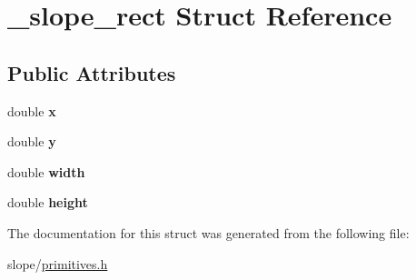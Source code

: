 \hypertarget{struct__slope__rect}{\section{\+\_\+slope\+\_\+rect Struct Reference}
\label{struct__slope__rect}
}
\subsection*{Public Attributes}
\begin{DoxyCompactItemize}
\item 
\hypertarget{struct__slope__rect_a50861a894de903db2ee81e7d47d35e47}{double {\bfseries x}}\label{struct__slope__rect_a50861a894de903db2ee81e7d47d35e47}

\item 
\hypertarget{struct__slope__rect_a6973dc88937c8034771edfc69288feb0}{double {\bfseries y}}\label{struct__slope__rect_a6973dc88937c8034771edfc69288feb0}

\item 
\hypertarget{struct__slope__rect_a09583ea10ed82dd3fe64da7e7a6bfb24}{double {\bfseries width}}\label{struct__slope__rect_a09583ea10ed82dd3fe64da7e7a6bfb24}

\item 
\hypertarget{struct__slope__rect_aee8ea863cafdbee525219b26bd400177}{double {\bfseries height}}\label{struct__slope__rect_aee8ea863cafdbee525219b26bd400177}

\end{DoxyCompactItemize}


The documentation for this struct was generated from the following file\+:\begin{DoxyCompactItemize}
\item 
slope/\hyperlink{primitives_8h}{primitives.\+h}\end{DoxyCompactItemize}
